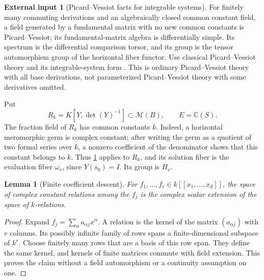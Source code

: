 \documentclass[11pt]{article}
\numberwithin{equation}{section}
\newtheorem{lemma}[lemma]{Lemma}
\theoremstyle{definition}
\newtheorem{externalinput}[externalinput]{External input}
\theoremstyle{remark}
\newcommand{\C}{\mathbb C}
\begin{document}
\begin{externalinput}[Picard--Vessiot facts for integrable systems]\label{input:pv}
For finitely many commuting derivations and an algebraically closed common
constant field, a field generated by a fundamental matrix with no new
common constants is Picard--Vessiot; its fundamental-matrix algebra is
differentially simple. Its spectrum is the differential comparison torsor,
and its group is the tensor automorphism group of the horizontal fiber
functor. Use classical Picard--Vessiot theory and its integrable-system
form \cite{PutSinger,Kolchin,CHM}. This is ordinary Picard--Vessiot theory
with all base derivations, not parameterized Picard--Vessiot theory with
some derivatives omitted.
\end{externalinput}

Put
\[
 R_k=K[Y,\det(Y)^{-1}]\subset\mathscr M(B),\qquad E=\C(S).
\]
The fraction field of $R_k$ has common constants $k$. Indeed, a horizontal
meromorphic germ is complex constant; after writing the germ as a quotient
of two formal series over $k$, a nonzero coefficient of the denominator
shows that this constant belongs to $k$. Thus \cref{input:pv} applies to
$R_k$, and its solution fiber is the evaluation fiber $\omega_v$, since
$Y(s_0)=I$. Its group is $H_v$.

\begin{lemma}[Finite coefficient descent]\label{lem:finite-linear}
For $f_1,\ldots,f_r\in k[[x_1,\ldots,x_d]]$, the space of complex
constant relations among the $f_j$ is the complex scalar extension of
the space of $k$-relations.
\end{lemma}
\begin{proof}
Expand $f_j=\sum_\alpha a_{\alpha j}x^\alpha$. A relation is the
kernel of the matrix $(a_{\alpha j})$ with $r$ columns. Its possibly
infinite family of rows spans a finite-dimensional subspace of $k^r$.
Choose finitely many rows that are a basis of this row span. They define
the same kernel, and kernels of finite matrices commute with field
extension. This proves the claim without a field automorphism or a
continuity assumption on one.
\end{proof}
\end{document}
